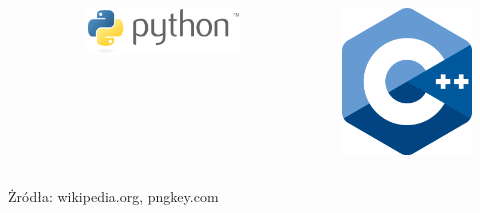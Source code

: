 \begin{frame}
\begin{columns}
\begin{column}{0.25\textwidth}
\begin{figure}
\begin{center}
				\end{center}
			\end{figure}
		\end{column}
				\begin{column}{0.25\textwidth}
			\begin{figure}
				\begin{center}
					\includegraphics[width=\textwidth]{img/Python_logo.png}			
				\end{center}
			\end{figure}
		\end{column}
		\begin{column}{0.25\textwidth}  %
						\begin{figure}
				\begin{center}
					\includegraphics[width=\textwidth]{img/C++_Logo.png}
				\end{center}
			\end{figure}
		\end{column}
	\end{columns}
\footnotesize{Żródła: wikipedia.org, pngkey.com}
\end{frame}


